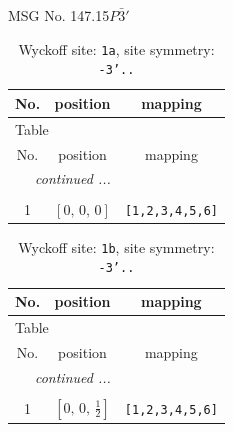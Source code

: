 \documentclass[fleqn,8pt]{jsarticle}
\begin{document}
\setcounter{MaxMatrixCols}{32}

\renewcommand{\tablename}{Table~}
\renewcommand{\figurename}{Figure~}
\begin{center}
\LARGE
MSG No. 147.15\quad$P\bar{3}'$
\end{center}
\renewcommand{\arraystretch}{1.2}
\begin{longtable}{ccc}
\caption{Wyckoff site: {\tt 1a}, site symmetry: {\tt -3'..}}
 \\
 \hline \hline
No. & position & mapping \\ \hline \endfirsthead

\multicolumn{2}{l}{\tablename\ \thetable{}} \\
 \hline \hline
No. & position & mapping \\ \hline \endhead

 \hline \hline
\multicolumn{2}{r}{\footnotesize\it continued ...} \\ \endfoot

 \hline \hline
\multicolumn{2}{r}{} \\ \endlastfoot

1 & $\left[ 0,\, 0,\, 0 \right]$ & {\tt [1,2,3,4,5,6]} \\
\end{longtable}
\renewcommand{\arraystretch}{1.2}
\begin{longtable}{ccc}
\caption{Wyckoff site: {\tt 1b}, site symmetry: {\tt -3'..}}
 \\
 \hline \hline
No. & position & mapping \\ \hline \endfirsthead

\multicolumn{2}{l}{\tablename\ \thetable{}} \\
 \hline \hline
No. & position & mapping \\ \hline \endhead

 \hline \hline
\multicolumn{2}{r}{\footnotesize\it continued ...} \\ \endfoot

 \hline \hline
\multicolumn{2}{r}{} \\ \endlastfoot

1 & $\left[ 0,\, 0,\, \frac{1}{2} \right]$ & {\tt [1,2,3,4,5,6]} \\
\end{longtable}
\renewcommand{\arraystretch}{1.2}
\end{document}
